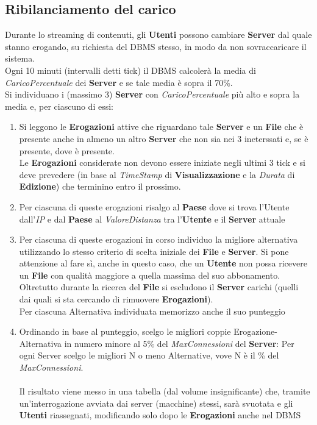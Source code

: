 \documentclass{article}
\begin{document}
\subsection{Ribilanciamento del carico}
Durante lo streaming di contenuti, gli \textbf{Utenti} possono cambiare \textbf{Server} dal quale stanno erogando, su richiesta del DBMS stesso, in modo da non sovraccaricare il sistema. \\
Ogni 10 minuti (intervalli detti tick) il DBMS calcolerà la media di \textit{CaricoPercentuale} dei \textbf{Server} e se tale media è sopra il 70\%. \\
Si individuano i (massimo 3) \textbf{Server} con \textit{CaricoPercentuale} più alto e sopra la media e, per ciascuno di essi: \\
\begin{enumerate}
    \item Si leggono le \textbf{Erogazioni} attive che riguardano tale \textbf{Server} e un \textbf{File} che è presente anche in almeno un altro \textbf{Server} che non sia nei 3 ineterssati e, se è presente, dove è presente. \\
    Le \textbf{Erogazioni} considerate non devono essere iniziate negli ultimi 3 tick e si deve prevedere (in base al \textit{TimeStamp} di \textbf{Visualizzazione} e la \textit{Durata} di \textbf{Edizione}) che terminino entro il prossimo.
    
    \item Per ciascuna di queste erogazioni risalgo al \textbf{Paese} dove si trova l'Utente dall'\textit{IP} e dal \textbf{Paese} al \textit{ValoreDistanza} tra l'\textbf{Utente} e il \textbf{Server} attuale
    
    \item Per ciascuna di queste erogazioni in corso individuo la migliore alternativa utilizzando lo stesso criterio di scelta iniziale dei \textbf{File} e \textbf{Server}. Si pone attenzione al fare sì, anche in questo caso, che un \textbf{Utente} non possa ricevere un \textbf{File} con qualità maggiore a quella massima del suo abbonamento. Oltretutto durante la ricerca del \textbf{File} si escludono il \textbf{Server} carichi (quelli dai quali si sta cercando di rimuovere \textbf{Erogazioni}). \\
    Per ciascuna Alternativa individuata memorizzo anche il suo punteggio
    
    \item Ordinando in base al punteggio, scelgo le migliori coppie Erogazione-Alternativa in numero minore al 5\% del \textit{MaxConnessioni} del \textbf{Server}: Per ogni Server scelgo le migliori N o meno Alternative, vove N è il \% del \textit{MaxConnessioni}. \\ \\
    Il risultato viene messo in una tabella (dal volume insignificante) che, tramite un'interrogazione avviata dai server (macchine) stessi, sarà svuotata e gli \textbf{Utenti} riassegnati, modificando solo dopo le \textbf{Erogazioni} anche nel DBMS
\end{enumerate}
\end{document}
